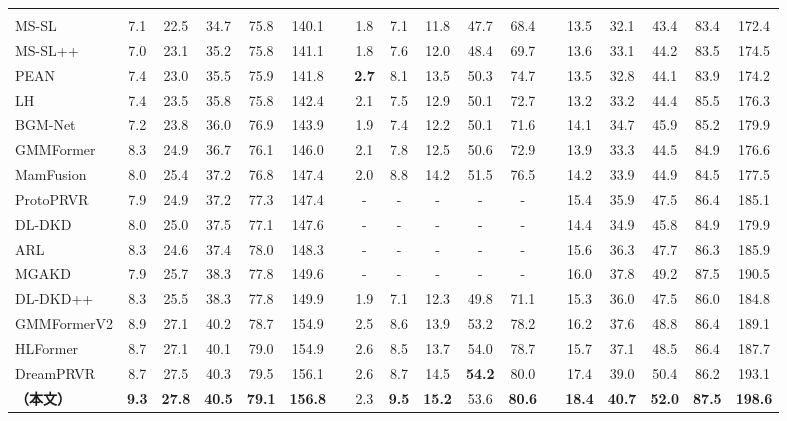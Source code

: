 \begin{table}[t]
{\begin{tabular}{l ccccc c ccccc c  ccccc}
\rowcolor{basegray}
\multicolumn{18}{l}{\scalebox{1.15}{\textit{部分相关视频检索（PRVR）}}}\\
MS-SL \cite{ms-sl}& 7.1 & 22.5 & 34.7 & 75.8 & 140.1 &&1.8 & 7.1 & 11.8 & 47.7 & 68.4& & 13.5 & 32.1 & 43.4 & 83.4 & 172.4       \\
MS-SL++ \cite{MS-SL++}& 7.0 & 23.1 & 35.2 & 75.8 & 141.1 && 1.8 & 7.6 & 12.0 & 48.4 & 69.7 && 13.6 & 33.1 & 44.2 & 83.5 & 174.5\\
 PEAN \cite{PEAN}&7.4 & 23.0 & 35.5 & 75.9 & 141.8 &&  \textbf{2.7} & 8.1 & 13.5 & 50.3 & 74.7 && 13.5 & 32.8 & 44.1 & 83.9 & 174.2 \\
  LH \cite{lh}& 7.4 & 23.5 & 35.8 & 75.8 & 142.4 &&2.1 & 7.5 & 12.9 & 50.1 & 72.7& & 13.2 & 33.2 & 44.4 & 85.5 & 176.3 \\
 BGM-Net \cite{bgmnet}& 7.2 & 23.8 & 36.0 & 76.9 & 143.9 &&1.9 & 7.4 & 12.2 & 50.1 & 71.6 && 14.1 & 34.7 & 45.9 & 85.2 & 179.9 \\
 GMMFormer \cite{GMMFORMER}&8.3 & 24.9 & 36.7 & 76.1 & 146.0 && 2.1 & 7.8 & 12.5 & 50.6 & 72.9 &&13.9 & 33.3 & 44.5 & 84.9 & 176.6 \\
 MamFusion \cite{mamfusion} &8.0 & 25.4 & 37.2 & 76.8 & 147.4 && 2.0 & 8.8 & 14.2 & 51.5 & 76.5 &&14.2 & 33.9 & 44.9 & 84.5 & 177.5 \\
 ProtoPRVR \cite{ProtoPRVR} & 7.9 & 24.9 & 37.2 & 77.3 & 147.4 && - & - & - & - & - && 15.4 & 35.9 & 47.5 & 86.4 & 185.1\\
 DL-DKD \cite{DL-DKD}& 8.0 & 25.0 & 37.5 & 77.1 & 147.6 &&- & - & - & - & - && 14.4 & 34.9 & 45.8 & 84.9 & 179.9  \\
ARL \cite{ARL}& 8.3 & 24.6 & 37.4 & 78.0 & 148.3 && - & - & - & - & - && 15.6 & 36.3 & 47.7 & 86.3 & 185.9\\
MGAKD \cite{MGAKD}& 7.9 & 25.7 & 38.3 & 77.8 & 149.6 && - & - & - & - & - && 16.0 & 37.8 & 49.2 & 87.5 & 190.5\\
DL-DKD++ \cite{dl-dkd++} & 8.3 & 25.5 & 38.3 & 77.8 & 149.9 && 1.9 & 7.1 & 12.3 & 49.8 & 71.1 && 15.3 & 36.0 & 47.5 & 86.0 & 184.8\\
GMMFormerV2 \cite{GMMFormerV2}& 8.9 & 27.1 & 40.2 & 78.7 & 154.9 && 2.5 & 8.6 & 13.9 & 53.2 & 78.2 && 16.2 & 37.6 & 48.8 & 86.4 & 189.1\\
HLFormer \cite{HLFormer}& 8.7 & 27.1 & 40.1 & 79.0 & 154.9 && 2.6 & 8.5 & 13.7 & 54.0 & 78.7 && 15.7 & 37.1 & 48.5 & 86.4 & 187.7\\
DreamPRVR \cite{dreamprvr} & 8.7 & 27.5 & 40.3 & 79.5 & 156.1 && 2.6 & 8.7 &14.5 &\textbf{54.2} &80.0 && 17.4 & 39.0 & 50.4 & 86.2 & 193.1\\
\rowcolor{ourscolor}
 \textbf{{\large \modelname{}} （本文）}& \textbf{9.3} & \textbf{27.8} & \textbf{40.5} & \textbf{79.1} & \textbf{156.8} &&2.3 & \textbf{9.5} & \textbf{15.2} & 53.6 & \textbf{80.6} &&   \textbf{18.4} & \textbf{40.7} & \textbf{52.0} & \textbf{87.5} & \textbf{198.6}     \\
\hline
\bottomrule
\end{tabular}
}
\end{table}

